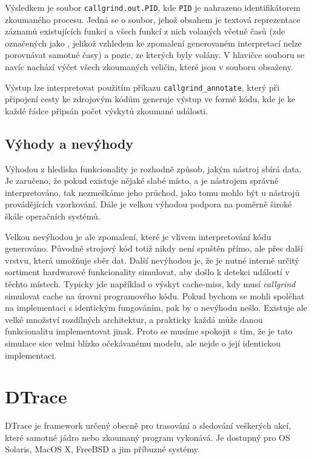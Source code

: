 \documentclass[czech,BP]{thesiskiv}
\begin{document}
Výsledkem je soubor \texttt{callgrind.out.PID}, kde \texttt{PID} je nahrazeno identifikátorem zkoumaného procesu. Jedná se o soubor, jehož obsahem je textová reprezentace záznamů existujících funkcí a všech funkcí z nich volaných včetně časů (zde označených jako , jelikož vzhledem ke zpomalení generovaném interpretací nelze porovnávat samotné časy) a pozic, ze kterých byly volány. V hlavičce souboru se navíc nachází výčet všech zkoumaných veličin, které jsou v souboru obsaženy\cite{grind3}.

Výstup lze interpretovat použitím příkazu \texttt{callgrind\_annotate}, který při připojení cesty ke zdrojovým kódům generuje výstup ve formě kódu, kde je ke každé řádce připsán počet výskytů zkoumané události.

\subsection*{Výhody a nevýhody}

Výhodou z hlediska funkcionality je rozhodně způsob, jakým nástroj sbírá data. Je zaručeno, že pokud existuje nějaké slabé místo, a je nástrojem správně interpretováno, tak nezmeškáme jeho průchod, jako tomu mohlo být u nástrojů provádějících vzorkování. Dále je velkou výhodou podpora na poměrně široké škále operačních systémů.

Velkou nevýhodou je ale zpomalení, které je vlivem interpretování kódu generováno. Původně strojový kód totiž nikdy není spuštěn přímo, ale přes další vrstvu, která umožňuje sběr dat. Další nevýhodou je, že je nutné interně určitý sortiment hardwarové funkcionality simulovat, aby došlo k detekci událostí v těchto místech. Typicky jde například o výskyt cache-miss, kdy musí \emph{callgrind} simulovat cache na úrovni programového kódu. Pokud bychom se mohli spoléhat na implementaci s identickým fungováním, pak by o nevýhodu nešlo. Existuje ale velké množství rozdílných architektur, a prakticky každá může danou funkcionalitu implementovat jinak. Proto se musíme spokojit s tím, že je tato simulace sice velmi blízko očekávanému modelu, ale nejde o její identickou implementaci.




\section{DTrace}

DTrace je framework určený obecně pro trasování a sledování veškerých akcí, které samotné jádro nebo zkoumaný program vykonává. Je dostupný pro OS Solaris, MacOS X, FreeBSD a jim příbuzné systémy.
\end{document}

